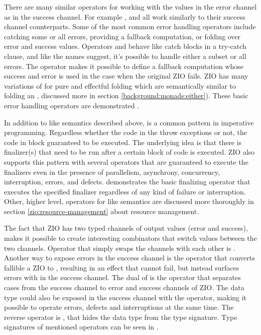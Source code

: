 There are many similar operators for working with the values in the error channel as in the success channel. For example ,  and  all work similarly to their success channel counterparts. Some of the most common error handling operators include catching some or all errors, providing a fallback computation, or folding over error and success values. Operators  and  behave like catch blocks in a try-catch clause, and like the names suggest, it's possible to handle either a subset or all errors. The  operator makes it possible to define a fallback computation whose success and error is used in the case when the original ZIO fails. ZIO has many variations of  for pure and effectful folding which are semantically similar to folding an , discussed more in section \ref{background:monads:either}). These basic error handling operators are demonstrated .



In addition to  like semantics described above,  is a common pattern in imperative programming. Regardless whether the code in the  throw exceptions or not, the code in  block guaranteed to be executed. The underlying idea is that there is finalizer(s) that need to be run after a certain block of code is executed. ZIO also supports this pattern with several operators that are guaranteed to execute the finalizers even in the presence of parallelism, asynchrony, concurrency, interruption, errors, and defects.  demonstrates the basic finalizing operator  that executes the specified finalizer regardless of any kind of failure or interruption. Other, higher level, operators for  like semantics are discussed more thoroughly in section \ref{zio:resource-management} about resource management.



The fact that ZIO has two typed channels of output values (error and success), makes it possible to create interesting combinators that switch values between the two channels. Operator that simply swaps the channels with each other is . Another way to expose errors in the success channel is the  operator that converts fallible a ZIO to , resulting in an effect that cannot fail, but instead surfaces errors with  in the success channel. The dual of  is the operator  that separates  cases from the success channel to error and success channels of ZIO. The  data type could also be exposed in the success channel with the  operator, making it possible to operate errors, defects and interruptions at the same time. The reverse operator is , that hides the  data type from the type signature. Type signatures of mentioned operators can be seen in .


